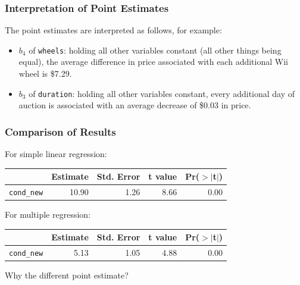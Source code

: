 \documentclass[handout]{beamer}
\newcommand{\blue}[1]{\textcolor{blue2}{#1}}
\begin{document}
\begin{frame}[fragile]
\frametitle{Interpretation of Point Estimates}

%
%
The point estimates are interpreted as follows, for example:
\begin{itemize}
\item $b_4$ of {\tt wheels}:  \blue{holding all other variables constant} (\blue{all other things being equal}), the average difference in price associated with each additional Wii wheel is \$7.29.
\pause
\item $b_3$ of {\tt duration}:  \blue{holding all other variables constant}, every additional day of auction is associated with an average decrease of \$0.03 in price.  
\end{itemize}

\end{frame}


\begin{frame}[fragile]
\frametitle{Comparison of Results}

For simple linear regression:
\begin{table}[ht]
\centering
\begin{tabular}{r|rrrr}
  \hline
 & Estimate & Std. Error & t value & Pr($>$$|$t$|$) \\ 
  \hline
{\tt cond\_new} & 10.90 & 1.26 & 8.66 & 0.00 \\ 
   \hline
\end{tabular}
\end{table}
\pause
For multiple regression:
\begin{table}[ht]
\centering
\begin{tabular}{r|rrrr}
  \hline
 & Estimate & Std. Error & t value & Pr($>$$|$t$|$) \\ 
  \hline
{\tt cond\_new} & 5.13 & 1.05 & 4.88 & 0.00 \\ 
   \hline
\end{tabular}
\end{table}
Why the different point estimate?
\end{frame}
\end{document}
